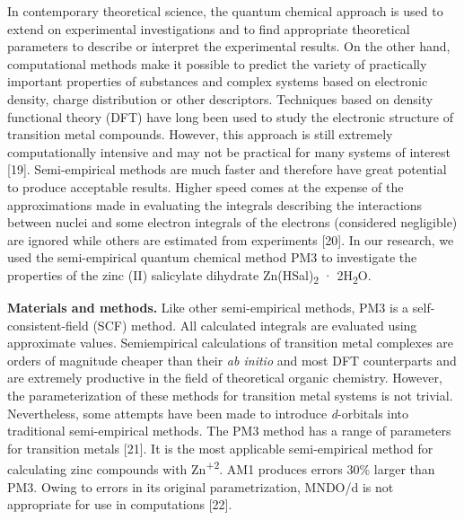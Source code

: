\begin{multicols}{2}
In contemporary theoretical science, the quantum chemical approach is
used to extend on experimental investigations and to find appropriate
theoretical parameters to describe or interpret the experimental
results. On the other hand, computational methods make it possible to
predict the variety of practically important properties of substances
and complex systems based on electronic density, charge distribution or
other descriptors. Techniques based on density functional theory (DFT)
have long been used to study the electronic structure of transition
metal compounds. However, this approach is still extremely
computationally intensive and may not be practical for many systems of
interest {[}19{]}. Semi-empirical methods are much faster and therefore
have great potential to produce acceptable results. Higher speed comes
at the expense of the approximations made in evaluating the integrals
describing the interactions between nuclei and some electron integrals
of the electrons (considered negligible) are ignored while others are
estimated from experiments {[}20{]}. In our research, we used the
semi-empirical quantum chemical method PM3 to investigate the properties
of the zinc (II) salicylate dihydrate Zn(HSal)\textsubscript{2} ·
2H\textsubscript{2}O.

{\bfseries Materials and methods.} Like other semi-empirical methods, PM3
is a self-consistent-field (SCF) method. All calculated integrals are
evaluated using approximate values. Semiempirical calculations of
transition metal complexes are orders of magnitude cheaper than their
\emph{ab initio} and most DFT counterparts and are extremely productive
in the field of theoretical organic chemistry. However, the
parameterization of these methods for transition metal systems is not
trivial. Nevertheless, some attempts have been made to introduce
\emph{d}-orbitals into traditional semi-empirical methods. The PM3
method has a range of parameters for transition metals {[}21{]}. It is
the most applicable semi-empirical method for calculating zinc compounds
with Zn\textsuperscript{+2}. AM1 produces errors 30\% larger than PM3.
Owing to errors in its original parametrization, MNDO/d is not
appropriate for use in computations {[}22{]}.


\end{multicols}
